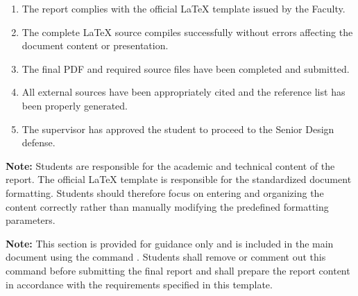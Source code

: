 {\begin{enumerate}[label=\arabic*., leftmargin=1.2cm, itemsep=2pt]
    \item The report complies with the official \LaTeX{} template
    issued by the Faculty.

    \item The complete \LaTeX{} source compiles successfully without
    errors affecting the document content or presentation.

    \item The final PDF and required source files have been completed
    and submitted.

    \item All external sources have been appropriately cited and the
    reference list has been properly generated.

    \item The supervisor has approved the student to proceed to the
    Senior Design defense.

\end{enumerate}

\vspace{0.4cm}

\noindent
\textbf{Note:}
Students are responsible for the academic and technical content of
the report. The official \LaTeX{} template is responsible for the
standardized document formatting. Students should therefore focus
on entering and organizing the content correctly rather than
manually modifying the predefined formatting parameters. 

\noindent
\textbf{Note:}
This section is provided for guidance only and is included in the main
document using the command \verb||.
Students shall remove or comment out this command before submitting the
final report and shall prepare the report content in accordance with the
requirements specified in this template.


} %

\clearpage

